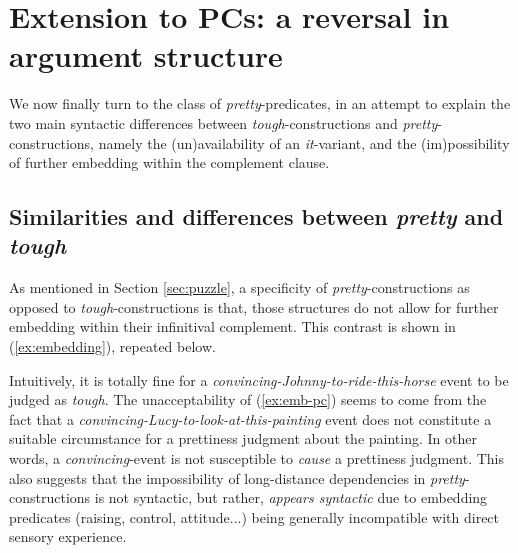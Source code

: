 \documentclass[11pt]{article}
\begin{document}
\section{Extension to PCs: a reversal in argument structure}\label{sec:pretty-constructions}
We now finally turn to the class of \textit{pretty}-predicates, in an attempt to explain the two main syntactic differences between \textit{tough}-constructions and \textit{pretty}-constructions, namely the (un)availability of an \textit{it}-variant, and the (im)possibility of further embedding within the complement clause.

\subsection{Similarities and differences between \textit{pretty} and \textit{tough}}
As mentioned in Section \ref{sec:puzzle}, a specificity of \textit{pretty}-constructions as opposed to \textit{tough}-constructions is that, those structures do not allow for further embedding within their infinitival complement. This contrast is shown in (\ref{ex:embedding}), repeated below.
\begin{exe}
	\begin{xlist}
	\end{xlist}
\end{exe}
Intuitively, it is totally fine for a \textit{convincing-Johnny-to-ride-this-horse} event to be judged as \textit{tough}. The unacceptability of (\ref{ex:emb-pc})  seems to come from the fact that a \textit{convincing-Lucy-to-look-at-this-painting} event does not constitute a suitable circumstance for a prettiness judgment about the painting. In other words, a \textit{convincing}-event is not susceptible to \textit{cause} a prettiness judgment. This also suggests that the impossibility of long-distance dependencies in \textit{pretty}-constructions is not syntactic, but rather, \textit{appears syntactic} due to embedding predicates (raising, control, attitude...) being generally incompatible with direct sensory experience. 
\end{document}
